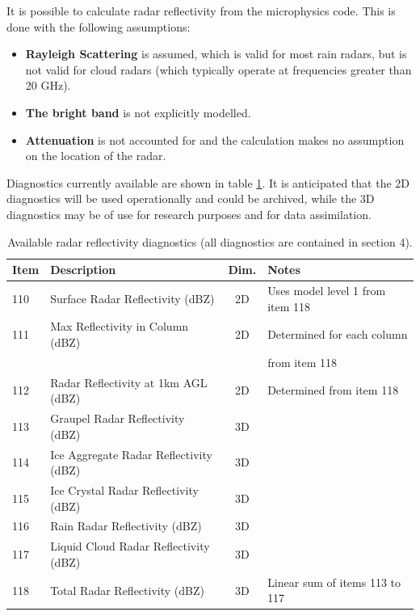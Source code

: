\documentclass{UMDP_article}
\begin{document}
It is possible to calculate radar reflectivity from the microphysics code. This 
is done with the following assumptions: 
\begin{itemize}
\item \textbf{Rayleigh Scattering} is assumed, which is valid for most rain 
radars, but is not valid for cloud radars (which typically operate at 
frequencies greater than 20 GHz).
\item \textbf{The bright band} is not explicitly modelled.
\item \textbf{Attenuation} is not accounted for and the calculation makes no 
assumption on the location of the radar. 
\end{itemize}
Diagnostics currently available are shown in table \ref{tab:radar}. It is 
anticipated that the 2D diagnostics will be used operationally and could be 
archived, while the 3D diagnostics may be of use for research purposes and 
for data assimilation.
\begin{table}[htp]
\begin{center}
\begin{tabular}{|l|l|c|l|}
\hline
Item & Description & Dim. & Notes \\
\hline
110 & Surface Radar Reflectivity (dBZ) & 2D & Uses model level 1 from item 118 \\
111 & Max Reflectivity in Column (dBZ) & 2D & Determined for each column \\
& & & from item 118 \\
112 & Radar Reflectivity at 1km AGL (dBZ) & 2D & Determined from item 118 \\
113 & Graupel Radar Reflectivity (dBZ) & 3D & \\
114 & Ice Aggregate Radar Reflectivity (dBZ) & 3D & \\
115 & Ice Crystal Radar Reflectivity (dBZ) & 3D & \\
116 & Rain Radar Reflectivity (dBZ) & 3D & \\
117 & Liquid Cloud Radar Reflectivity (dBZ) & 3D & \\
118 & Total Radar Reflectivity (dBZ) & 3D & Linear sum of items 113 to 117 \\
\hline
\end{tabular}
\caption{\label{tab:radar} Available radar reflectivity diagnostics (all 
diagnostics are contained in section 4). }
\end{center}
\end{table}
\end{document}

